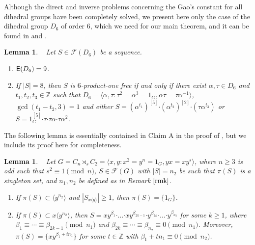 \documentclass[leqno,a4paper]{amsart}
\def\E{{\sf E}}
\def\F{{\mathcal F}}
\def\bd{{\boldsymbol{\cdot}}}
\def\Z{\mathbb Z}
\theoremstyle{plain}
\newtheorem{lemma}[theorem]{Lemma}
\theoremstyle{definition}
\numberwithin{equation}{section}
\begin{document}
	
	\smallskip
	Although the direct and inverse problems concerning the Gao's constant for all dihedral groups have been completely solved, we present here only the case of the dihedral group $D_6$ of order 6, which we need for our main theorem, and it can be found in \cite[Theorem 8]{Bas} and \cite[Theorem 1.2]{OZ1}.
	
	
	\smallskip
	\begin{lemma} \label{lem:D6}~
	Let $S \in \mathcal F (D_6)$ be a sequence.
		\begin{enumerate}
		\item $\E(D_6) = 9$.
		
		\smallskip
		\item If $|S| = 8$, then $S$ is $6$-product-one free if and only if there exist $\alpha, \tau \in D_6$ and $t_1, t_2, t_3 \in \Z$ such that $D_6 = \langle \alpha, \tau \colon \tau^2 = \alpha^3 = 1_G, \alpha \tau = \tau \alpha^{-1} \rangle$, $\gcd(t_1-t_2,3) = 1$ and either $S = (\alpha^{t_1})^{[5]} \bd (\alpha^{t_2})^{[2]} \bd (\tau \alpha^{t_3})$ or $S = 1_G^{[5]} \bd \tau \bd \tau \alpha \bd \tau \alpha^2$.
		\end{enumerate}
	\end{lemma}
	
	

	
	\smallskip
	The following lemma is essentially contained in Claim A in the proof of \cite[Proposition 5.1]{AMR}, but we include its proof here for completeness.

	\smallskip
	\begin{lemma} \label{lem:claima}~
		Let $G = C_n \rtimes_s C_2=\langle x,y \colon x^2 = y^n = 1_G, yx = xy^s \rangle$, where $n\ge 3$ is odd such that $s^2\equiv 1\pmod n$, $S  \in \F(G)$ with $|S| = n_2$ be such that $\pi(S)$ is a singleton set, and $n_1, n_2$ be defined as in Remark $\ref{rmk}$.
		\begin{enumerate}
			\item If $\pi(S) \subset \langle y^{n_2} \rangle$ and $|S_{x\langle y \rangle}| \ge 1$, then $\pi(S) = \{1_G\}$.
			
			\item If $\pi(S) \subset x\langle y^{n_2} \rangle$, then $S = xy^{\beta_1} \bd \ldots \bd xy^{\beta_{2k-1}} \bd y^{\beta_{2k}} \bd \ldots \bd y^{\beta_{n_2}}$ for some $k\ge 1$, where $\beta_1 \equiv \cdots \equiv \beta_{2k-1} \pmod {n_1}$ and $\beta_{2k} \equiv \cdots \equiv \beta_{n_2} \equiv 0 \pmod {n_1}$. Moreover, $\pi(S) = \{xy^{\beta_1 + tn_1}\}$ for some $t \in \Z$ with $\beta_1 + tn_1 \equiv 0 \pmod {n_2}$.
		\end{enumerate}
	\end{lemma}
	
\end{document}
